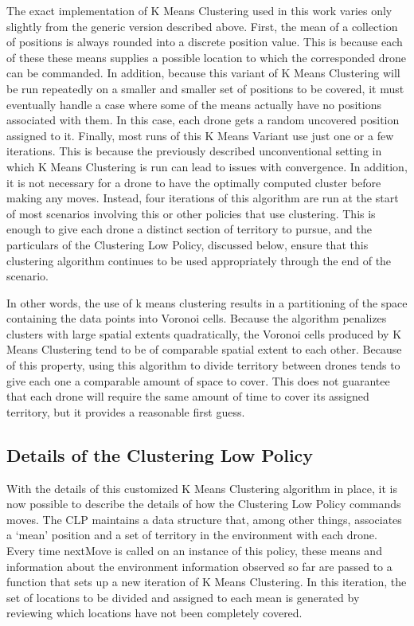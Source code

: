 The exact implementation of K Means Clustering used in this work varies only slightly from the generic version described above. First, the mean of a collection of positions is always rounded into a discrete position value. This is because each of these these means supplies a possible location to which the corresponded drone can be commanded. In addition, because this variant of K Means Clustering will be run repeatedly on a smaller and smaller set of positions to be covered, it must eventually handle a case where some of the means actually have no positions associated with them. In this case, each drone gets a random uncovered position assigned to it. Finally, most runs of this K Means Variant use just one or a few iterations. This is because the previously described unconventional setting in which K Means Clustering is run can lead to issues with convergence. In addition, it is not necessary for a drone to have the optimally computed cluster before making any moves. Instead, four iterations of this algorithm are run at the start of most scenarios involving this or other policies that use clustering. This is enough to give each drone a distinct section of territory to pursue, and the particulars of the Clustering Low Policy, discussed below, ensure that this clustering algorithm continues to be used appropriately through the end of the scenario.

In other words, the use of k means clustering results in a partitioning of the space containing the data points into Voronoi cells. Because the algorithm penalizes clusters with large spatial extents quadratically, the Voronoi cells produced by K Means Clustering tend to be of comparable spatial extent to each other. Because of this property, using this algorithm to divide territory between drones tends to give each one a comparable amount of space to cover. This does not guarantee that each drone will require the same amount of time to cover its assigned territory, but it provides a reasonable first guess.

\subsection{Details of the Clustering Low Policy}

With the details of this customized K Means Clustering algorithm in place, it is now possible to describe the details of how the Clustering Low Policy commands moves. The CLP maintains a data structure that, among other things, associates a `mean' position and a set of territory in the environment with each drone. Every time nextMove is called on an instance of this policy, these means and information about the environment information observed so far are passed to a function that sets up a new iteration of K Means Clustering. In this iteration, the set of locations to be divided and assigned to each mean is generated by reviewing which locations have not been completely covered.

